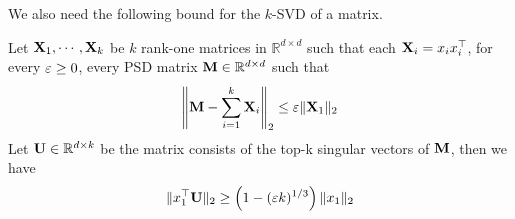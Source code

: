 We also need the following bound for the $k$-SVD of a matrix.

\begin{lemma}\label{lem:k_SVD}
Let $\bold{X}_1, \cdots, \bold{X}_k$ be $k$ rank-one matrices in $\mathbb{R}^{d \times d}$ such that each $\bold{X}_i = x_i x_i^{\top}$, for every $\varepsilon \geq 0$, every PSD matrix $\bold{M} \in \mathbb{R}^{d \times d}$ such that 
\begin{align}
\left\| \bold{M} - \sum_{i = 1}^k \bold{X}_i \right\|_2 \leq \varepsilon \| \bold{X}_1 \|_2
\end{align}
Let $\bold{U} \in \mathbb{R}^{d \times k}$ be the matrix consists of the top-k singular vectors of $\bold{M}$, then we have
\begin{align}
\| x_1^{\top}\bold{U} \|_2 \geq \left(1 - (\varepsilon k)^{1/3}\right)\| x_1 \|_2
\end{align}

\end{lemma}
